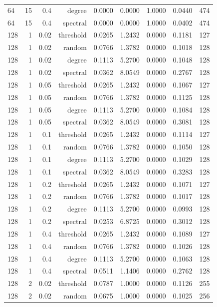\begin{table}[t]
\begin{tabular}{lrrrrrrrr}
64 & 15 & 0.4 & degree & 0.0000 & 0.0000 & 1.0000 & 0.0440 & 474 \\
64 & 15 & 0.4 & spectral & 0.0000 & 0.0000 & 1.0000 & 0.0402 & 474 \\
128 & 1 & 0.02 & threshold & 0.0265 & 1.2432 & 0.0000 & 0.1181 & 127 \\
128 & 1 & 0.02 & random & 0.0766 & 1.3782 & 0.0000 & 0.1018 & 128 \\
128 & 1 & 0.02 & degree & 0.1113 & 5.2700 & 0.0000 & 0.1048 & 128 \\
128 & 1 & 0.02 & spectral & 0.0362 & 8.0549 & 0.0000 & 0.2767 & 128 \\
128 & 1 & 0.05 & threshold & 0.0265 & 1.2432 & 0.0000 & 0.1067 & 127 \\
128 & 1 & 0.05 & random & 0.0766 & 1.3782 & 0.0000 & 0.1125 & 128 \\
128 & 1 & 0.05 & degree & 0.1113 & 5.2700 & 0.0000 & 0.1084 & 128 \\
128 & 1 & 0.05 & spectral & 0.0362 & 8.0549 & 0.0000 & 0.3081 & 128 \\
128 & 1 & 0.1 & threshold & 0.0265 & 1.2432 & 0.0000 & 0.1114 & 127 \\
128 & 1 & 0.1 & random & 0.0766 & 1.3782 & 0.0000 & 0.1050 & 128 \\
128 & 1 & 0.1 & degree & 0.1113 & 5.2700 & 0.0000 & 0.1029 & 128 \\
128 & 1 & 0.1 & spectral & 0.0362 & 8.0549 & 0.0000 & 0.3283 & 128 \\
128 & 1 & 0.2 & threshold & 0.0265 & 1.2432 & 0.0000 & 0.1071 & 127 \\
128 & 1 & 0.2 & random & 0.0766 & 1.3782 & 0.0000 & 0.1017 & 128 \\
128 & 1 & 0.2 & degree & 0.1113 & 5.2700 & 0.0000 & 0.0993 & 128 \\
128 & 1 & 0.2 & spectral & 0.0253 & 6.8725 & 0.0000 & 0.3012 & 128 \\
128 & 1 & 0.4 & threshold & 0.0265 & 1.2432 & 0.0000 & 0.1089 & 127 \\
128 & 1 & 0.4 & random & 0.0766 & 1.3782 & 0.0000 & 0.1026 & 128 \\
128 & 1 & 0.4 & degree & 0.1113 & 5.2700 & 0.0000 & 0.1063 & 128 \\
128 & 1 & 0.4 & spectral & 0.0511 & 1.1406 & 0.0000 & 0.2762 & 128 \\
128 & 2 & 0.02 & threshold & 0.0787 & 1.0000 & 0.0000 & 0.1126 & 255 \\
128 & 2 & 0.02 & random & 0.0675 & 1.0000 & 0.0000 & 0.1025 & 256 \\

\end{tabular}
\end{table}

